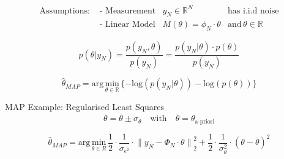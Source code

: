 \begin{tcolorbox}[colback=yellow!5!white,colframe=yellow!75!white,coltitle=black,title=Bayesian Estimation and the Maximum a Posteriori Estimate]
	
	\begin{equation*}
	\begin{array}{llll}
	\text{Assumptions:} & \text{ - Measurement} & y_N \in \mathbb{R}^N  & \text{has i.i.d noise} \\
	& \text{ - Linear Model} & M(\theta) = \phi_N \cdot \theta &  \text{and} \, \theta \in \mathbb{R} 
	\end{array}
	\end{equation*}
	
	
	
	\begin{equation*} 
	p(\theta |{ y }_{ N }) = \frac{ p(y_N,\theta) }{ p( y_N ) } = \frac{ p( y_N | \theta )\cdot p( \theta ) }{ p( y_N ) }
	\end{equation*}
	
	\begin{equation*}
	\hat{\theta}_{MAP} = \text{arg} \, \underset { \theta \in \mathbb{R} }{ \text{min} } \, \{ - \text{log} (p ( { y }_{ N }| \theta) ) - \text{log} ( p ( \theta ) ) \}
	\end{equation*}
	
	MAP Example: Regularised Least Squares
	\begin{equation*}
	\theta = \overline \theta \pm \sigma_\theta \quad \text{with} \quad \overline \theta =  \theta_{\text{a-priori} }
	\end{equation*}
	
	\begin{equation*}
	\hat \theta_{MAP} = \text{arg} \, \underset { \theta \in { R } }{ \text{min} } \, \frac { 1 }{ 2 } \cdot \frac { 1 }{ { \sigma }_{ \epsilon^2 }} \cdot { \parallel y_N - \Phi_N \cdot \theta \parallel  }_{ 2 }^{ 2 } + \frac { 1 }{ 2 } \cdot \frac { 1 }{ { \sigma }_{ \theta }^{ 2 } } \cdot { (\theta -  \overline{\theta}) }^{ 2 }
	\end{equation*}
	
\end{tcolorbox}

